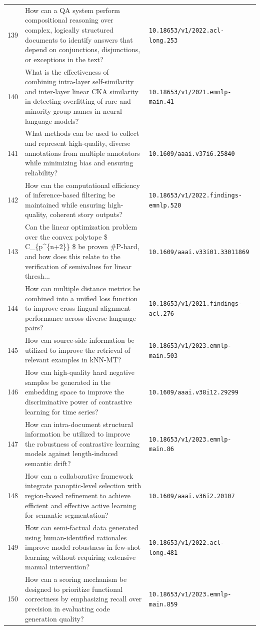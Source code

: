 \documentclass[runningheads]{llncs}
\begin{document}
\begin{longtable}{@{}p{0.5cm}p{7.2cm}p{2.5cm}@{}}
139 & How can a QA system perform compositional reasoning over complex, logically structured documents to identify answers that depend on conjunctions, disjunctions, or exceptions in the text? & \texttt{10.18653/v1/2022.acl-long.253} \\
140 & What is the effectiveness of combining intra-layer self-similarity and inter-layer linear CKA similarity in detecting overfitting of rare and minority group names in neural language models? & \texttt{10.18653/v1/2021.emnlp-main.41} \\
141 & What methods can be used to collect and represent high-quality, diverse annotations from multiple annotators while minimizing bias and ensuring reliability? & \texttt{10.1609/aaai.v37i6.25840} \\
142 & How can the computational efficiency of inference-based filtering be maintained while ensuring high-quality, coherent story outputs? & \texttt{10.18653/v1/2022.findings-emnlp.520} \\
143 & Can the linear optimization problem over the convex polytope \$ C\_\{p\textasciicircum{}\{n+2\}\} \$ be proven \#P-hard, and how does this relate to the verification of semivalues for linear thresh... & \texttt{10.1609/aaai.v33i01.33011869} \\
144 & How can multiple distance metrics be combined into a unified loss function to improve cross-lingual alignment performance across diverse language pairs? & \texttt{10.18653/v1/2021.findings-acl.276} \\
145 & How can source-side information be utilized to improve the retrieval of relevant examples in kNN-MT? & \texttt{10.18653/v1/2023.emnlp-main.503} \\
146 & How can high-quality hard negative samples be generated in the embedding space to improve the discriminative power of contrastive learning for time series? & \texttt{10.1609/aaai.v38i12.29299} \\
147 & How can intra-document structural information be utilized to improve the robustness of contrastive learning models against length-induced semantic drift? & \texttt{10.18653/v1/2023.emnlp-main.86} \\
148 & How can a collaborative framework integrate panoptic-level selection with region-based refinement to achieve efficient and effective active learning for semantic segmentation? & \texttt{10.1609/aaai.v36i2.20107} \\
149 & How can semi-factual data generated using human-identified rationales improve model robustness in few-shot learning without requiring extensive manual intervention? & \texttt{10.18653/v1/2022.acl-long.481} \\
150 & How can a scoring mechanism be designed to prioritize functional correctness by emphasizing recall over precision in evaluating code generation quality? & \texttt{10.18653/v1/2023.emnlp-main.859} \\
\end{longtable}
\end{document}
